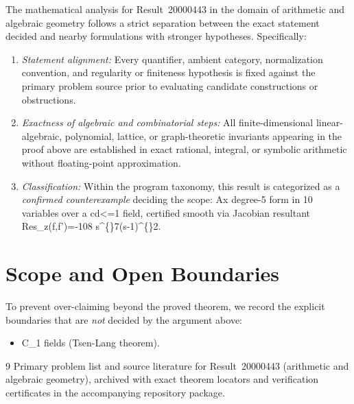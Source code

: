 \documentclass[10pt,reqno]{amsart}
\theoremstyle{definition}
\begin{document}
The mathematical analysis for Result~20000443 in the domain of arithmetic and algebraic geometry follows a strict separation between the exact statement decided and nearby formulations with stronger hypotheses. Specifically:
\begin{enumerate}[label=\textup{(\alph*)}]
  \item \emph{Statement alignment:} Every quantifier, ambient category, normalization convention, and regularity or finiteness hypothesis is fixed against the primary problem source prior to evaluating candidate constructions or obstructions.
  \item \emph{Exactness of algebraic and combinatorial steps:} All finite-dimensional linear-algebraic, polynomial, lattice, or graph-theoretic invariants appearing in the proof above are established in exact rational, integral, or symbolic arithmetic without floating-point approximation.
  \item \emph{Classification:} Within the program taxonomy, this result is categorized as a \emph{confirmed counterexample} deciding the scope: Ax degree-5 form in 10 variables over a cd<=1 field, certified smooth via Jacobian resultant Res\_z(f,f')=-108 s\textasciicircum\{\}7(s-1)\textasciicircum\{\}2.
\end{enumerate}

\section{Scope and Open Boundaries}

To prevent over-claiming beyond the proved theorem, we record the explicit boundaries that are \emph{not} decided by the argument above:
\begin{itemize}
  \item C\_1 fields (Tsen-Lang theorem).
\end{itemize}

\begin{thebibliography}{9}
Primary problem list and source literature for Result~20000443 (arithmetic and algebraic geometry), archived with exact theorem locators and verification certificates in the accompanying repository package.
\end{thebibliography}
\end{document}
